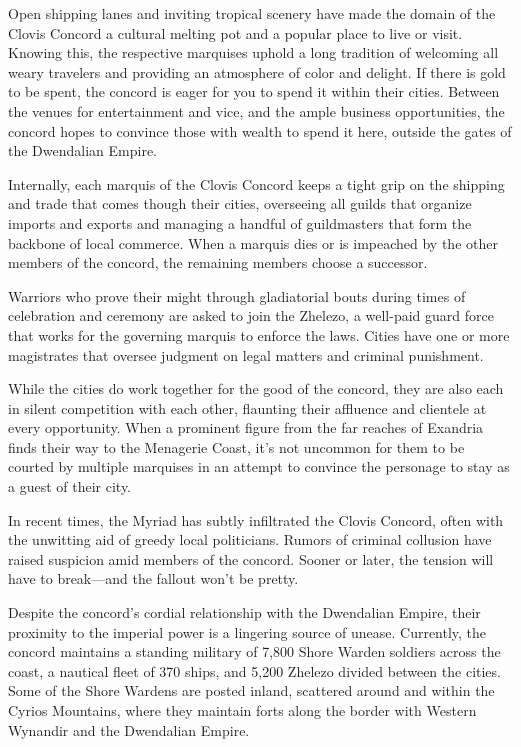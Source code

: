 \documentclass[10pt,a4paper,twoside,bg=print,twocolumn,openany,nodeprecatedcode]{dndbook}
\begin{document}
Open shipping lanes and inviting tropical scenery have made the domain of the Clovis Concord a cultural melting pot and a popular place to live or visit. Knowing this, the respective marquises uphold a long tradition of welcoming all weary travelers and providing an atmosphere of color and delight. If there is gold to be spent, the concord is eager for you to spend it within their cities. Between the venues for entertainment and vice, and the ample business opportunities, the concord hopes to convince those with wealth to spend it here, outside the gates of the Dwendalian Empire.

Internally, each marquis of the Clovis Concord keeps a tight grip on the shipping and trade that comes though their cities, overseeing all guilds that organize imports and exports and managing a handful of guildmasters that form the backbone of local commerce. When a marquis dies or is impeached by the other members of the concord, the remaining members choose a successor.

Warriors who prove their might through gladiatorial bouts during times of celebration and ceremony are asked to join the Zhelezo, a well-paid guard force that works for the governing marquis to enforce the laws. Cities have one or more magistrates that oversee judgment on legal matters and criminal punishment.

While the cities do work together for the good of the concord, they are also each in silent competition with each other, flaunting their affluence and clientele at every opportunity. When a prominent figure from the far reaches of Exandria finds their way to the Menagerie Coast, it's not uncommon for them to be courted by multiple marquises in an attempt to convince the personage to stay as a guest of their city.

In recent times, the Myriad has subtly infiltrated the Clovis Concord, often with the unwitting aid of greedy local politicians. Rumors of criminal collusion have raised suspicion amid members of the concord. Sooner or later, the tension will have to break—and the fallout won't be pretty.

Despite the concord's cordial relationship with the Dwendalian Empire, their proximity to the imperial power is a lingering source of unease. Currently, the concord maintains a standing military of 7,800 Shore Warden soldiers across the coast, a nautical fleet of 370 ships, and 5,200 Zhelezo divided between the cities. Some of the Shore Wardens are posted inland, scattered around and within the Cyrios Mountains, where they maintain forts along the border with Western Wynandir and the Dwendalian Empire.
\end{document}
